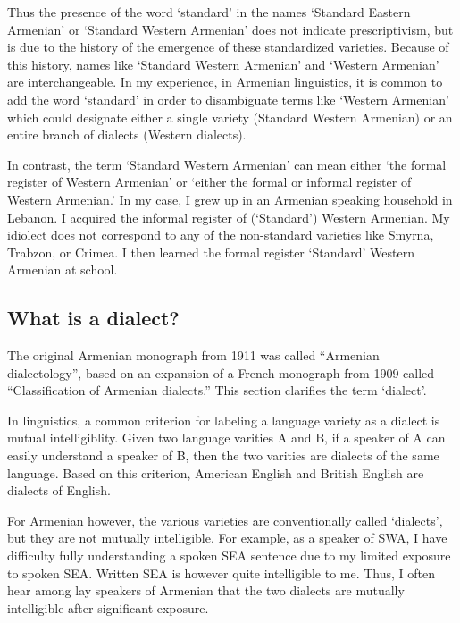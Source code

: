 Thus the presence of the word `standard' in the names `Standard Eastern Armenian' or `Standard Western Armenian' does not indicate prescriptivism, but is due to the history of the emergence of these standardized varieties. Because of this history, names like `Standard Western Armenian' and `Western Armenian' are interchangeable. In my experience, in Armenian linguistics, it is common to add the word `standard' in order to disambiguate terms like `Western Armenian' which could designate either a single variety (Standard Western Armenian) or an entire branch of dialects (Western dialects). 

In contrast, the term `Standard Western Armenian' can mean either `the formal register of Western Armenian' or `either the formal or informal register of Western Armenian.' In my case, I grew up in an Armenian speaking household in Lebanon. I acquired the informal register of (`Standard') Western Armenian. My idiolect does not correspond to any of the non-standard varieties like Smyrna, Trabzon, or Crimea. I then learned the formal register `Standard' Western Armenian at school. 









\subsection{What is a dialect?}\label{sec:HossepIntro:armenian:whatisdialect}

The original Armenian monograph from 1911 was called ``Armenian dialectology'', based on an expansion of a French monograph from 1909 called ``Classification of Armenian dialects.'' This section clarifies the term `dialect'. 

In linguistics, a common criterion for labeling a language variety as a dialect is mutual intelligiblity. Given two language varities A and B, if a speaker of A can easily understand a speaker of B, then the two varities are dialects of the same language. Based on this criterion, American English and British English are dialects of English. 

For Armenian however, the various varieties are conventionally called `dialects', but they are not mutually intelligible. For example, as a speaker of SWA, I have difficulty fully understanding a spoken SEA sentence due to my limited exposure to spoken SEA. Written SEA is however quite intelligible to me. Thus, I often hear among lay speakers of Armenian that the two dialects are mutually intelligible after significant exposure. 

